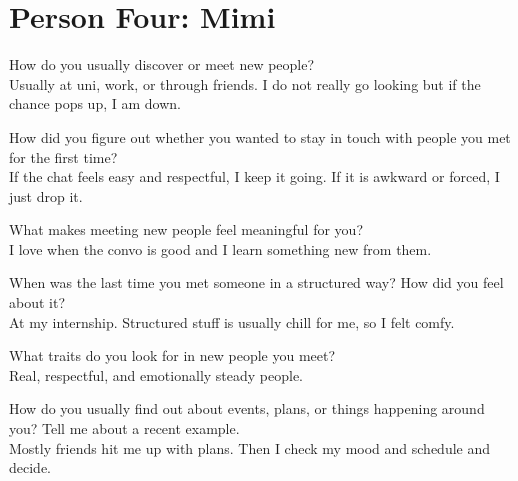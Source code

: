 \documentclass[11pt]{article}
\begin{document}
\section*{Person Four: Mimi}
How do you usually discover or meet new people?\\
Usually at uni, work, or through friends. I do not really go looking but if the chance pops up, I am down.

How did you figure out whether you wanted to stay in touch with people you met for the first time?\\
If the chat feels easy and respectful, I keep it going. If it is awkward or forced, I just drop it.

What makes meeting new people feel meaningful for you?\\
I love when the convo is good and I learn something new from them.

When was the last time you met someone in a structured way? How did you feel about it?\\
At my internship. Structured stuff is usually chill for me, so I felt comfy.

What traits do you look for in new people you meet?\\
Real, respectful, and emotionally steady people.

How do you usually find out about events, plans, or things happening around you? Tell me about a recent example.\\
Mostly friends hit me up with plans. Then I check my mood and schedule and decide.
\end{document}
